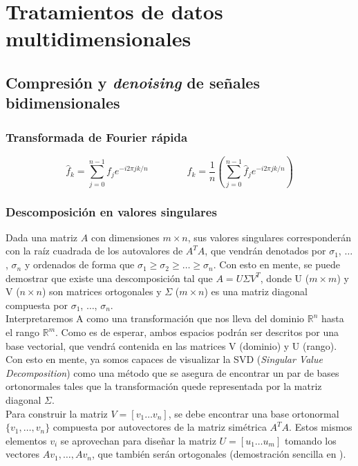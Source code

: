 \section{Tratamientos de datos multidimensionales}


\subsection{Compresión y \textit{denoising} de señales bidimensionales}

\subsubsection{Transformada de Fourier rápida}

\begin{equation}
     \hat f_k = \sum^{n-1}_{j=0} f_j e^{-i2\pi j k/n}
     \qquad\qquad
     f_k = \frac{1}{n} \left( \sum^{n-1}_{j=0} \hat f_j e^{-i2\pi j k/n} \right)
\end{equation}

\newpage
\subsubsection{Descomposición en valores singulares}

Dada una matriz $A$ con dimensiones $m \times n$, sus valores singulares corresponderán con la raíz cuadrada de los autovalores de $A^T A$, que vendrán denotados por $\sigma_1$, $\dots$, $\sigma_n$ y ordenados de forma que $\sigma_1 \geq \sigma_2 \geq \dots \geq \sigma_n$. Con esto en mente, se puede demostrar \cite{biblia} que existe una descomposición tal que $A = U \Sigma V^T$, donde U ($m \times m$) y V ($n \times n$) son matrices ortogonales y $\Sigma$ ($m \times n$) es una matriz diagonal compuesta por $\sigma_1$, $\dots$, $\sigma_n$. \\

Interpretaremos A como una transformación que nos lleva del dominio $\mathds{R}^n$ hasta el rango $\mathds{R}^m$. Como es de esperar, ambos espacios podrán ser descritos por una base vectorial, que vendrá contenida en las matrices V (dominio) y U (rango). Con esto en mente, ya somos capaces de visualizar la SVD (\textit{Singular Value Decomposition}) como una método que se asegura de encontrar un par de bases ortonormales tales que la transformación quede representada por la matriz diagonal $\Sigma$. \\

Para construir la matriz $V = [v_1 \dots v_n]$, se debe encontrar una base ortonormal $\{v_1, \dots, v_n\}$ compuesta por autovectores de la matriz simétrica $A^T A$. Estos mismos elementos $v_i$ se aprovechan para diseñar la matriz $U = [u_1 \dots u_m]$ tomando los vectores $Av_1, \dots, Av_n$, que también serán ortogonales (demostración sencilla en \cite{biblia}). \\


